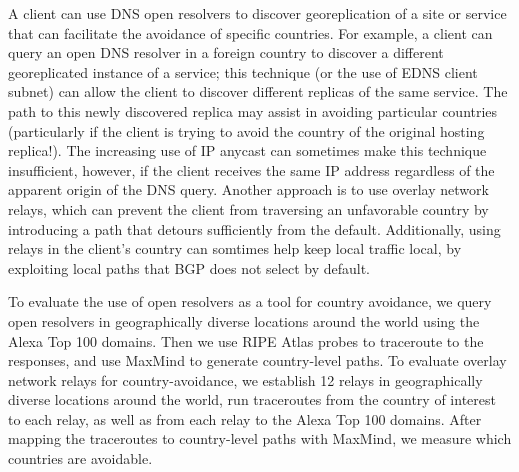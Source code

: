 A client can use DNS open resolvers to discover georeplication of a site
or service that can facilitate the avoidance of specific countries. For
example, a client can query an open DNS resolver in a foreign country to
discover a different georeplicated instance of a service; this technique
(or the use of EDNS client subnet) can allow the client to discover
different replicas of the same service. The path to this newly
discovered replica may assist in avoiding particular countries
(particularly if the client is trying to avoid the country of the
original hosting replica!).  The increasing use of IP anycast can
sometimes make this technique
insufficient, however, if the client
receives the same IP address regardless of the apparent origin of the
DNS query.  Another approach is to use overlay network relays, which can
prevent the client from traversing an unfavorable country by introducing
a path that detours sufficiently from the default. Additionally, using
relays in the client's country can somtimes help keep local traffic
local, by exploiting local paths that BGP does not select by default.
  
To evaluate the use of open resolvers as a tool for country avoidance, we
query open resolvers in geographically diverse locations around the world 
using the Alexa Top 100 domains.  Then we use RIPE Atlas probes to traceroute 
to the responses, and use MaxMind to generate country-level paths.  To evaluate 
overlay network relays for country-avoidance, we establish 12 relays in geographically 
diverse locations around the world, run traceroutes from the country of interest to 
each relay, as well as from each relay to the Alexa Top 100 domains.  After mapping 
the traceroutes to country-level paths with MaxMind, we measure which countries are 
avoidable.


